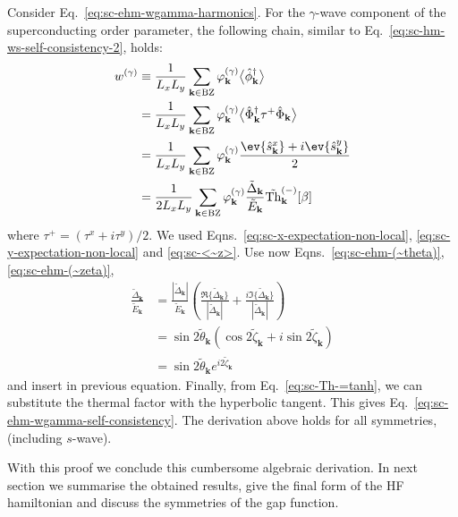 \begin{tabproof}
	
	Consider Eq.~\eqref{eq:sc-ehm-wgamma-harmonics}. For the $\gamma$-wave component of the superconducting order parameter, the following chain, similar to Eq.~\eqref{eq:sc-hm-ws-self-consistency-2}, holds:
	\[
	\begin{aligned}
		w^{(\gamma)} &\equiv \frac{1}{L_x L_y} \sum_{\mathbf{k}\in\mathrm{BZ}} \varphi_\mathbf{k}^{(\gamma)} \big\langle
		\hat \phi_\mathbf{k}^\dagger
		\big\rangle\\
		&= \frac{1}{L_x L_y} \sum_{\mathbf{k}\in\mathrm{BZ}} \varphi_\mathbf{k}^{(\gamma)}  \big\langle
		\hat \Phi_\mathbf{k}^\dagger \tau^+ \hat \Phi_\mathbf{k}
		\big\rangle \\
		&= \frac{1}{L_x L_y} \sum_{\mathbf{k}\in\mathrm{BZ}} \varphi_\mathbf{k}^{(\gamma)} \frac{\ev{\hat s_\mathbf{k}^x} + i \ev{\hat s_\mathbf{k}^y} }{2} \\
		&= \frac{1}{2L_x L_y} \sum_{\mathbf{k}\in\mathrm{BZ}} \varphi_\mathbf{k}^{(\gamma)} \frac{\tilde{\Delta}_\mathbf{k}}{\tilde{E}_\mathbf{k}} \tilde{\mathrm{Th}}_\mathbf{k}^{(-)}[\beta]
	\end{aligned}
	\]
	where $\tau^+ = (\tau^x + i \tau^y)/2$. We used Eqns.~\eqref{eq:sc-x-expectation-non-local}, \eqref{eq:sc-y-expectation-non-local} and \eqref{eq:sc-<~z>}. Use now Eqns.~\eqref{eq:sc-ehm-(~theta)}, \eqref{eq:sc-ehm-(~zeta)},
	\[
	\begin{aligned}
		\frac{\tilde{\Delta}_\mathbf{k}}{\tilde{E}_\mathbf{k}} &= \frac{|\tilde{\Delta}_\mathbf{k}|}{\tilde{E}_\mathbf{k}} \left(	
			\frac{\Re\{\tilde{\Delta}_\mathbf{k}\}}{|\tilde{\Delta}_\mathbf{k}|} + \frac{i\Im\{\tilde{\Delta}_\mathbf{k}\}}{|\tilde{\Delta}_\mathbf{k}|}
		\right)  \\
		&= \sin 2\tilde{\theta}_\mathbf{k} \left(
			\cos 2\tilde{\zeta}_\mathbf{k}  + i \sin 2\tilde{\zeta}_\mathbf{k} 
		\right) \\
		&= \sin 2\tilde{\theta}_\mathbf{k}  e^{i 2\tilde{\zeta}_\mathbf{k}}
	\end{aligned}
	\]
	and insert in previous equation. Finally, from Eq.~\eqref{eq:sc-Th-=tanh}, we can substitute the thermal factor with the hyperbolic tangent. This gives Eq.~\eqref{eq:sc-ehm-wgamma-self-consistency}.
	The derivation above holds for all symmetries, (including $s$-wave).
\end{tabproof}
%
With this proof we conclude this cumbersome algebraic derivation. In next section we summarise the obtained results, give the final form of the HF hamiltonian and discuss the symmetries of the gap function.

